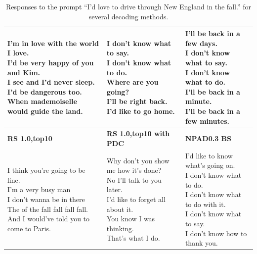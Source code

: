 \begin{table}[t]
\begin{tabular}{|l|l|l|}
\makecell[l]{
I'm in love with the world I love.\\
I'd be very happy of you and Kim.\\
I see and I'd never sleep.\\
I'd be dangerous too.\\
When mademoiselle would guide the land.\\
}&
\makecell[l]{
I don't know what to say.\\
I don't know what to do.\\
Where are you going?\\
I'll be right back.\\
I'd like to go home.\\
}&
\makecell[l]{
I'll be back in a few days.\\
I don't know what to say.\\
I don't know what to do.\\
I'll be back in a minute.\\
I'll be back in a few minutes.\\
}
\\
    \hline
    \hline
    \textbf{RS 1.0,top10} & \textbf{RS 1.0,top10 with PDC} &  \textbf{NPAD0.3 BS} \\
    \hline
\makecell[l]{
I think you're going to be fine.\\
I'm a very busy man\\
I don't wanna be in there\\
The of the fall fall fall fall.\\
And I would've told you to come to Paris.\\
}&
\makecell[l]{
Why don't you show me how it's done?\\
No I'll talk to you later.\\
I'd like to forget all about it.\\
You know I was thinking.\\
That's what I do.\\
}
&
\makecell[l]{
I'd like to know what's going on.\\
I don't know what to do.\\
I don't know what to do with it.\\
I don't know what to say.\\
I don't know how to thank you.\\
}\\
\hline
    \end{tabular}
    \caption{Responses to the prompt ``I'd love to drive through New England in the fall.'' for several decoding methods.}
    \label{examplesA}
\end{table}


